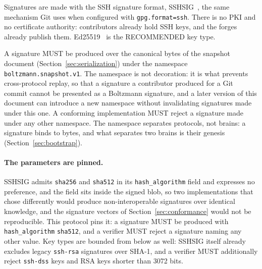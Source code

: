 \documentclass[11pt,a4paper]{article}
\begin{document}
Signatures are made with the SSH signature format, SSHSIG~\cite{sshsig}, the
same mechanism Git uses when configured with \texttt{gpg.format=ssh}. There is
no PKI and no certificate authority: contributors already hold SSH keys, and the
forges already publish them. Ed25519~\cite{rfc8032} is the RECOMMENDED key type.

A signature MUST be produced over the canonical bytes of the snapshot document
(Section~\ref{sec:serialization}) under the namespace
\texttt{boltzmann.snapshot.v1}. The namespace is not decoration: it is what
prevents cross-protocol replay, so that a signature a contributor produced for a
Git commit cannot be presented as a Boltzmann signature, and a later version of this document can introduce a new namespace without
invalidating signatures made under this one. A conforming implementation MUST
reject a signature made under any other namespace. The namespace separates
protocols, not brains: a signature binds to bytes, and what separates two
brains is their genesis (Section~\ref{sec:bootstrap}).

\paragraph{The parameters are pinned.}
SSHSIG admits \texttt{sha256} and \texttt{sha512} in its
\texttt{hash\_algorithm} field and expresses no preference, and the field
sits inside the signed blob, so two implementations that chose differently
would produce non-interoperable signatures over identical knowledge, and the
signature vectors of Section~\ref{sec:conformance} would not be reproducible.
This protocol pins it: a signature MUST be produced with
\texttt{hash\_algorithm} \texttt{sha512}, and a verifier MUST reject a
signature naming any other value. Key types are bounded from below as well:
SSHSIG itself already excludes legacy \texttt{ssh-rsa} signatures over SHA-1,
and a verifier MUST additionally reject \texttt{ssh-dss} keys and RSA keys
shorter than 3072 bits.
\end{document}
